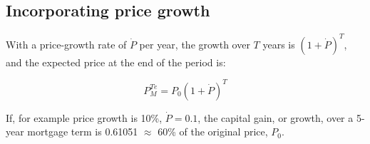  
\subsection{Incorporating price growth}

With a price-growth rate of $\dot P$ per year, the growth over $T$ years is $(1+\dot P)^T$, and  %
the expected price at the end of the period is:

\[P_M^{Te}=P_0(1+\dot P)^T\]

If, for example price growth is 10\%, $\dot P= 0.1$, the {capital gain}, or growth, over a 5-year mortgage term is 0.61051 $\approx$ 60\% of the original price, $P_0$.



